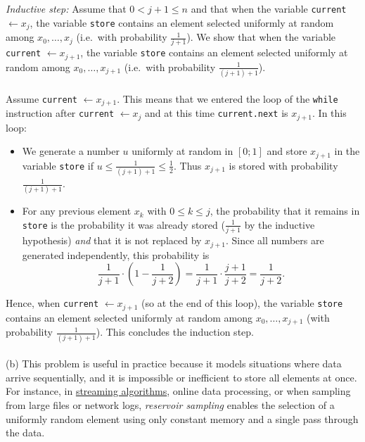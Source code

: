 \begin{solution}
    \textit{Inductive step:} Assume that \( 0 < j+1 \le n \) and that when the variable \texttt{current} \( \gets x_j \), the variable \texttt{store} contains an element selected uniformly at random among \( x_0, \dots, x_j \) (i.e.\ with probability \( \frac{1}{j+1} \)). We show that when the variable \texttt{current} \( \gets x_{j+1} \), the variable \texttt{store} contains an element selected uniformly at random among \( x_0, \dots, x_{j+1} \) (i.e.\ with probability \( \frac{1}{\left(j+1\right)+1} \)).
    \\\\
    Assume \texttt{current} \( \gets x_{j+1} \). This means that we entered the loop of the \texttt{while} instruction after \texttt{current} \( \gets x_j \) and at this time \texttt{current.next} is \( x_{j+1} \). In this loop:
    \begin{itemize}
        \item We generate a number \( u \) uniformly at random in \( \left[0;1\right] \) and store \( x_{j+1} \) in the variable \texttt{store} if \( u \le \frac{1}{\left(j+1\right)+1} \leq \frac{1}{2} \). Thus \( x_{j+1} \) is stored with probability \( \frac{1}{\left(j+1\right)+1} \).
        \item For any previous element \( x_k \) with \( 0 \le k \le j \), the probability that it remains in \texttt{store} is the probability it was already stored (\( \frac{1}{j+1} \) by the inductive hypothesis) \emph{and} that it is not replaced by \( x_{j+1} \). Since all numbers are generated independently, this probability is
            \[
                \frac{1}{j+1} \cdot \left(1 - \frac{1}{j+2}\right) = \frac{1}{j+1} \cdot \frac{j+1}{j+2} = \frac{1}{j+2}.
            \]
    \end{itemize}
    Hence, when \texttt{current} \( \gets x_{j+1} \) (so at the end of this loop), the variable \texttt{store} contains an element selected uniformly at random among \( x_0, \dots, x_{j+1} \) (with probability \( \frac{1}{\left(j+1\right)+1} \)). This concludes the induction step.
    \\\\
    (b) This problem is useful in practice because it models situations where data arrive sequentially, and it is impossible or inefficient to store all elements at once. For instance, in \href{https://en.wikipedia.org/wiki/Streaming_algorithm}{streaming algorithms}, online data processing, or when sampling from large files or network logs, \textit{reservoir sampling} enables the selection of a uniformly random element using only constant memory and a single pass through the data.
\end{solution}
